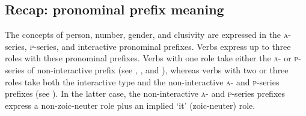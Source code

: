 \subsection{Recap: pronominal prefix meaning} \label{Recap -- pronominal prefix meaning}
The concepts of person, number, gender, and clusivity are expressed in the \textsc{a}-series, \textsc{p}-series, and interactive pronominal prefixes. Verbs express up to three roles with these pronominal prefixes. Verbs with one role take either the \textsc{a}- or \textsc{p}-series of non-interactive prefix (see , , and ), whereas verbs with two or three roles take both the interactive type and the non-interactive \textsc{a}- and \textsc{p}-series prefixes (see ). In the latter case, the non-interactive \textsc{a}- and \textsc{p}-series prefixes express a non-zoic-neuter role plus an implied ‘it’ (zoic-neuter) role.
